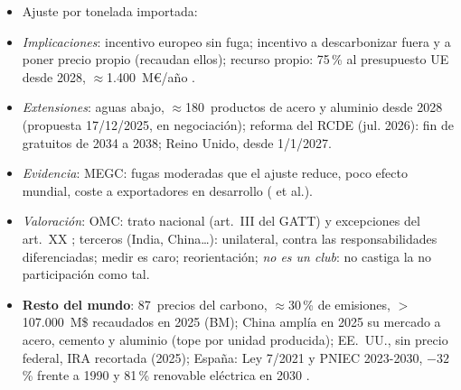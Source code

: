 \documentclass{article}
\begin{document}
\begin{columnas}
\begin{itemize}
\begin{itemize}
  \item certificados al precio medio de subasta del RCDE menos el pagado en origen;
  \item al ritmo de la retirada de gratuitos (97,5\,\% en 2026 $\to$ 0~en 2034);
  \item transitorio 1/10/2023-31/12/2025; definitivo 1/1/2026; certificados desde feb.\ 2027;
  \item Ómnibus (2025/2083): exentos $<$50~t/año ($\approx$90\,\% de importadores, 1\,\% de emisiones).
  \end{itemize}
\item Ajuste por tonelada importada:
\end{itemize}
\begin{itemize}
\item \emph{Implicaciones}: incentivo europeo sin fuga; incentivo a descarbonizar fuera y a poner precio propio (recaudan ellos); recurso propio: 75\,\% al presupuesto UE desde 2028, $\approx$1.400~M€/año .
\item \emph{Extensiones}: aguas abajo, $\approx$180~productos de acero y aluminio desde 2028 (propuesta 17/12/2025, en negociación); reforma del RCDE (jul. 2026): fin de gratuitos de 2034 a 2038; Reino Unido, desde 1/1/2027.
\item \emph{Evidencia}: MEGC: fugas moderadas que el ajuste reduce, poco efecto mundial, coste a exportadores en desarrollo ( et al.).
\item \emph{Valoración}: OMC: trato nacional (art.~III del GATT) y excepciones del art.~XX ; terceros (India, China\ldots): unilateral, contra las responsabilidades diferenciadas; medir es caro; reorientación; \emph{no es un club}: no castiga la no participación como tal.
\item \textbf{Resto del mundo}: 87~precios del carbono, $\approx$30\,\% de emisiones, $>$107.000~M\$ recaudados en 2025 (BM); China amplía en 2025 su mercado a acero, cemento y aluminio (tope por unidad producida); EE.~UU., sin precio federal, IRA recortada (2025); España: Ley 7/2021 y PNIEC 2023-2030, $-32$\,\% frente a 1990 y 81\,\% renovable eléctrica en 2030 .
\end{itemize}


\end{columnas}
\end{document}
